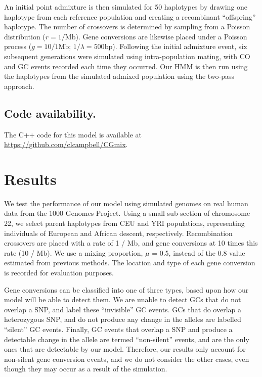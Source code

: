 An initial point admixture is then simulated for 50 haplotypes by drawing one haplotype from each reference population and creating a recombinant ``offspring'' haplotype.
The number of crossovers is determined by sampling from a Poisson distribution ($r = 1 / \mathrm{Mb}$).
Gene conversions are likewise placed under a Poisson process ($g = 10/1 \mathrm{Mb}$; $1/\lambda = 500 \mathrm{bp}$).
Following the initial admixture event, six subsequent generations were simulated using intra-population mating, with CO and GC events recorded each time they occurred. 
Our HMM is then run using the haplotypes from the simulated admixed population using the two-pass approach.

\subsection{Code availability.}
The C++ code for this model is available at \url{https://github.com/clcampbell/CGmix}.


\section{Results}


We test the performance of our model using simulated genomes on real human data from the 1000 Genomes Project\cite{1000G2015}.
Using a small sub-section of chromosome 22, we select parent haplotypes from CEU and YRI populations, representing individuals of European and African descent, respectively.
Recombination crossovers are placed with a rate of 1 / Mb, and gene conversions at 10 times this rate (10 / Mb).
We use a mixing proportion, $\mu$ = 0.5, instead of the 0.8 value estimated from previous methods\cite{Price2009}.
The location and type of each gene conversion is recorded for evaluation purposes.

Gene conversions can be classified into one of three types, based upon how our model will be able to detect them.
We are unable to detect GCs that do not overlap a SNP, and label these ``invisible'' GC events.
GCs that do overlap a heterozygous SNP, and do not produce any change in the alleles are labelled ``silent'' GC events.
Finally, GC events that overlap a SNP and produce a detectable change in the allele are termed ``non-silent'' events, and are the only ones that are detectable by our model.
Therefore, our results only account for non-silent gene conversion events, and we do not consider the other cases, even though they may occur as a result of the simulation.

